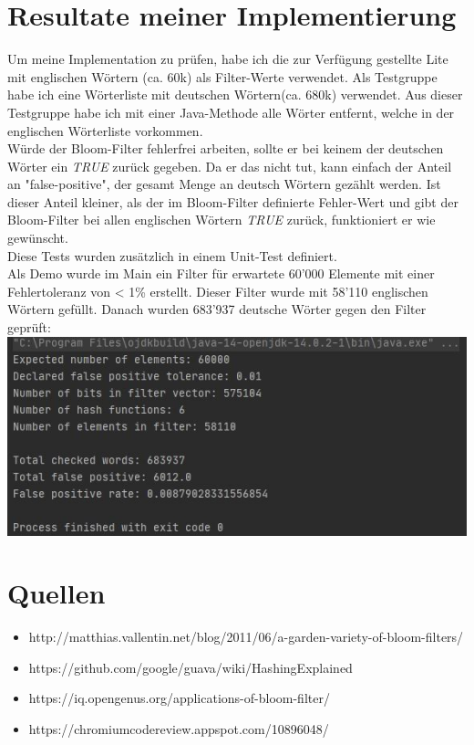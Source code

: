 \documentclass[12pt]{article}
\begin{document}
\section*{Resultate meiner Implementierung}
Um meine Implementation zu prüfen,
habe ich die zur Verfügung gestellte Lite mit englischen Wörtern (ca. 60k) als Filter-Werte verwendet.
Als Testgruppe habe ich eine Wörterliste mit deutschen Wörtern(ca. 680k) verwendet.
Aus dieser Testgruppe habe ich mit einer Java-Methode alle Wörter entfernt,
welche in der englischen Wörterliste vorkommen.
\\
Würde der Bloom-Filter fehlerfrei arbeiten,
sollte er bei keinem der deutschen Wörter ein {\it TRUE} zurück gegeben.
Da er das nicht tut, kann einfach der Anteil an "false-positive",
der gesamt Menge an deutsch Wörtern gezählt werden.
Ist dieser Anteil kleiner, als der im Bloom-Filter definierte Fehler-Wert und
gibt der Bloom-Filter bei allen englischen Wörtern {\it TRUE} zurück,
funktioniert er wie gewünscht.
\\
Diese Tests wurden zusätzlich in einem Unit-Test definiert.
\\
Als Demo wurde im Main ein Filter für erwartete 60'000 Elemente
mit einer Fehlertoleranz von < 1\% erstellt.
Dieser Filter wurde mit 58'110 englischen Wörtern gefüllt.
Danach wurden 683'937 deutsche Wörter gegen den Filter geprüft:\\
\includegraphics[width=\textwidth]{output}
\section*{Quellen}
\begin{itemize}
\item http://matthias.vallentin.net/blog/2011/06/a-garden-variety-of-bloom-filters/
\item https://github.com/google/guava/wiki/HashingExplained
\item https://iq.opengenus.org/applications-of-bloom-filter/
\item https://chromiumcodereview.appspot.com/10896048/
\end{itemize}
\end{document}
